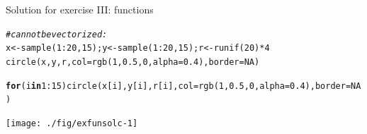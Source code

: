 \documentclass[xcolor=table,       handout,    xcolor=dvipsnames]{beamer}\usepackage[]{graphicx}\usepackage[]{color}
\makeatletter
\newcommand{\hlnum}[1]{\textcolor[rgb]{0,0,0}{#1}}
\newcommand{\hlcom}[1]{\textcolor[rgb]{0,0.392,0}{\textit{#1}}}
\newcommand{\hlopt}[1]{\textcolor[rgb]{0,0,0}{#1}}
\newcommand{\hlstd}[1]{\textcolor[rgb]{0,0,0}{#1}}
\newcommand{\hlkwa}[1]{\textcolor[rgb]{1,0,0}{\textbf{#1}}}
\newcommand{\hlkwb}[1]{\textcolor[rgb]{0,0,0}{#1}}
\newcommand{\hlkwc}[1]{\textcolor[rgb]{1,0,1}{#1}}
\newcommand{\hlkwd}[1]{\textcolor[rgb]{0,0,1}{#1}}
\newenvironment{kframe}{%
 \def\at@end@of@kframe{}%
 \ifinner\ifhmode%
  \def\at@end@of@kframe{\end{minipage}}%
  \begin{minipage}{\columnwidth}%
 \fi\fi%
 \def\FrameCommand##1{\hskip\@totalleftmargin \hskip-\fboxsep
 \colorbox{shadecolor}{##1}\hskip-\fboxsep
     \hskip-\linewidth \hskip-\@totalleftmargin \hskip\columnwidth}%
 \MakeFramed {\advance\hsize-\width
   \@totalleftmargin\z@ \linewidth\hsize
   \@setminipage}}%
 {\par\unskip\endMakeFramed%
 \at@end@of@kframe}
\newenvironment{knitrout}{}{} %
\newcounter{exercisecount}
\makeatother
\begin{document}
\begin{frame}[fragile]{Solution for exercise  III: functions}
\begin{knitrout}\scriptsize
{}\color{fgcolor}\begin{kframe}
\begin{alltt}
\hlcom{# can not be vectorized:}
\hlstd{x} \hlkwb{<-} \hlkwd{sample}\hlstd{(}\hlnum{1}\hlopt{:}\hlnum{20}\hlstd{,} \hlnum{15}\hlstd{) ;  y} \hlkwb{<-} \hlkwd{sample}\hlstd{(}\hlnum{1}\hlopt{:}\hlnum{20}\hlstd{,} \hlnum{15}\hlstd{) ; r} \hlkwb{<-} \hlkwd{runif}\hlstd{(}\hlnum{20}\hlstd{)}\hlopt{*}\hlnum{4}
\hlkwd{circle}\hlstd{(x,y,r,} \hlkwc{col}\hlstd{=}\hlkwd{rgb}\hlstd{(}\hlnum{1}\hlstd{,}\hlnum{0.5}\hlstd{,}\hlnum{0}\hlstd{,}\hlkwc{alpha}\hlstd{=}\hlnum{0.4}\hlstd{),} \hlkwc{border}\hlstd{=}\hlnum{NA}\hlstd{)}
\end{alltt}


{\ttfamily\noindent\color{warningcolor}{\#\# Warning in circle(x, y, r, col = rgb(1, 0.5, 0, alpha = 0.4), border = NA): Only the first element of the vectors is used.}}\begin{alltt}
\hlkwa{for}\hlstd{(i} \hlkwa{in} \hlnum{1}\hlopt{:}\hlnum{15}\hlstd{)} \hlkwd{circle}\hlstd{(x[i],y[i],r[i],} \hlkwc{col}\hlstd{=}\hlkwd{rgb}\hlstd{(}\hlnum{1}\hlstd{,}\hlnum{0.5}\hlstd{,}\hlnum{0}\hlstd{,}\hlkwc{alpha}\hlstd{=}\hlnum{0.4}\hlstd{),} \hlkwc{border}\hlstd{=}\hlnum{NA}\hlstd{)}
\end{alltt}
\end{kframe}

{\centering \texttt{[image: ./fig/exfunsolc-1]} 

}



\end{knitrout}
\end{frame}

\end{document}
